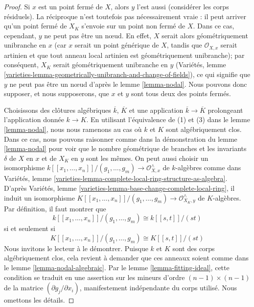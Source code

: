 \begin{proof}
Si $x$ est un point fermé de $X$, alors $y$ l'est aussi (considérer les corps résiduels). La réciproque n'est toutefois pas nécessairement vraie : il peut arriver qu'un point fermé de $X_K$ s'envoie sur un point non fermé de $X$. Dans ce cas, cependant, $y$ ne peut pas être un nœud. En effet, $X$ serait alors géométriquement unibranche en $x$ (car $x$ serait un point générique de $X$, tandis que $\mathcal{O}_{X, x}$ serait artinien et que tout anneau local artinien est géométriquement unibranche); par conséquent, $X_K$ serait géométriquement unibranche en $y$ (Variétés, lemme \ref{varieties-lemma-geometrically-unibranch-and-change-of-fields}), ce qui signifie que $y$ ne peut pas être un nœud d'après le lemme \ref{lemma-nodal}. Nous pouvons donc supposer, et nous supposerons, que $x$ et $y$ sont tous deux des points fermés.

\medskip\noindent
Choisissons des clôtures algébriques $\overline{k}$, $\overline{K}$ et une application $\overline{k} \to \overline{K}$ prolongeant l'application donnée $k \to K$. En utilisant l'équivalence de (1) et (3) dans le lemme \ref{lemma-nodal}, nous nous ramenons au cas où $k$ et $K$ sont algébriquement clos. Dans ce cas, nous pouvons raisonner comme dans la démonstration du lemme \ref{lemma-nodal} pour voir que le nombre géométrique de branches et les invariants $\delta$ de $X$ en $x$ et de $X_K$ en $y$ sont les mêmes. On peut aussi choisir un isomorphisme $k[[x_1, \ldots, x_n]]/(g_1, \ldots, g_m) \to \mathcal{O}_{X, x}^\wedge$ de $k$-algèbres comme dans Variétés, lemme \ref{varieties-lemma-complete-local-ring-structure-as-algebra}. D'après Variétés, lemme \ref{varieties-lemma-base-change-complete-local-ring}, il induit un isomorphisme $K[[x_1, \ldots, x_n]]/(g_1, \ldots, g_m) \to \mathcal{O}_{X_K, y}^\wedge$ de $K$-algèbres. Par définition, il faut montrer que $$
k[[x_1, \ldots, x_n]]/(g_1, \ldots, g_m) \cong k[[s, t]]/(st)
$$ si et seulement si $$
K[[x_1, \ldots, x_n]]/(g_1, \ldots, g_m) \cong K[[s, t]]/(st)
$$ Nous invitons le lecteur à le démontrer. Puisque $k$ et $K$ sont des corps algébriquement clos, cela revient à demander que ces anneaux soient comme dans le lemme \ref{lemma-nodal-algebraic}. Par le lemme \ref{lemma-fitting-ideal}, cette condition se traduit en une assertion sur les mineurs d'ordre $(n - 1) \times (n - 1)$ de la matrice $(\partial g_j/\partial x_i)$, manifestement indépendante du corps utilisé. Nous omettons les détails.
\end{proof}

